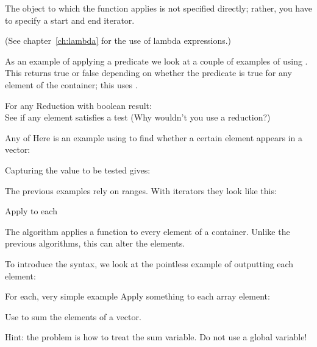 The object to which the function applies is not specified directly; 
rather, you have to specify a start
and end iterator.

(See 
chapter~\ref{ch:lambda} for the use of lambda expressions.)

As an example of applying a predicate we look at a couple of examples
of using .
This returns true or false depending on whether the predicate is true
for any element of the container;
this uses .

\begin{block}{For any}
  \label{sl:alg-any}
  Reduction with boolean result:\\
  See if any element satisfies a test
  (Why wouldn't you use a  reduction?)
\end{block}

\begin{block}{Any of}
  \label{sl:lambda-any}
  Here is an example using  to find
  whether a certain  element appears in a vector:
\end{block}

Capturing the value to be tested gives:
%

\begin{remark}
  The previous examples rely on  ranges.
  With iterators they look like this:
\end{remark}

 {Apply to each}

The  algorithm applies a function to every element
of a container.
Unlike the previous algorithms, this can alter the elements.

To introduce the syntax, we look at the pointless example of
outputting each element:

%

\begin{block}{For each, very simple example}
  \label{sl:alg-each}
  Apply something to each array element:
\end{block}

\begin{exercise}
  \label{ex:for-each-sum}
  Use  to sum the elements of a vector.

  Hint: the problem is how to treat the sum variable.
  Do not use a global variable!
\end{exercise}

